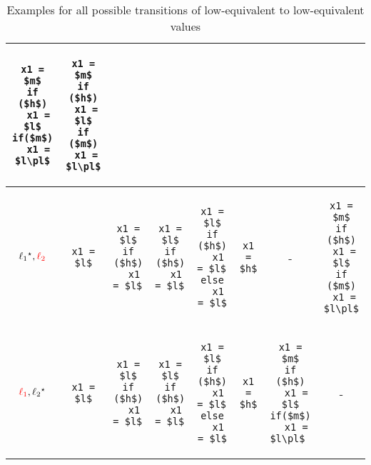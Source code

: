 \begin{table*}
\begin{tabular} {|c|c|c|c|c|c|c|c|}
\begin{lstlisting}
x1 = $m$
if ($h$)
  x1 = $l$
if($m$)
  x1 = $l\pl$
\end{lstlisting}   
& 
\begin{lstlisting}
x1 = $m$
if ($h$)
 x1 = $l$
if ($m$)
 x1 = $l\pl$
\end{lstlisting}   
\\
\hline
$\ell_1 {}^\star, \textcolor{red}{\ell_2}$ & 
\begin{lstlisting}
x1 = $l$
\end{lstlisting}
&
\begin{lstlisting}
x1 = $l$
if ($h$)
  x1 = $l$ 
\end{lstlisting} 
& 
\begin{lstlisting}
x1 = $l$
if ($h$)
  x1 = $l$ 
\end{lstlisting} 
& 
\begin{lstlisting}
x1 = $l$
if ($h$)
  x1 = $l$ 
else
  x1 = $l$
\end{lstlisting} 
& 
\begin{lstlisting}
x1 = $h$
\end{lstlisting} 
&
- 
&
\begin{lstlisting}
x1 = $m$
if ($h$)
 x1 = $l$
if ($m$)
 x1 = $l\pl$
\end{lstlisting} 
\\
\hline
$\textcolor{red}{\ell_1}, \ell_2 {}^\star$ &
\begin{lstlisting}
x1 = $l$
\end{lstlisting} 
& 
\begin{lstlisting}
x1 = $l$
if ($h$)
  x1 = $l$ 
\end{lstlisting} 
& 
\begin{lstlisting}
x1 = $l$
if ($h$)
  x1 = $l$ 
\end{lstlisting} 
& 
\begin{lstlisting}
x1 = $l$
if ($h$)
  x1 = $l$ 
else
  x1 = $l$
\end{lstlisting} 
& 
\begin{lstlisting}
x1 = $h$
\end{lstlisting} 
& 
\begin{lstlisting}
x1 = $m$
if ($h$)
  x1 = $l$
if($m$)
  x1 = $l\pl$ 
\end{lstlisting} 
& 
-
\\
\hline
\end{tabular}
\renewcommand\thetable{A.1}
\caption{Examples for all possible transitions of low-equivalent to
  low-equivalent values}\label{tab:flows}
\end{table*}

